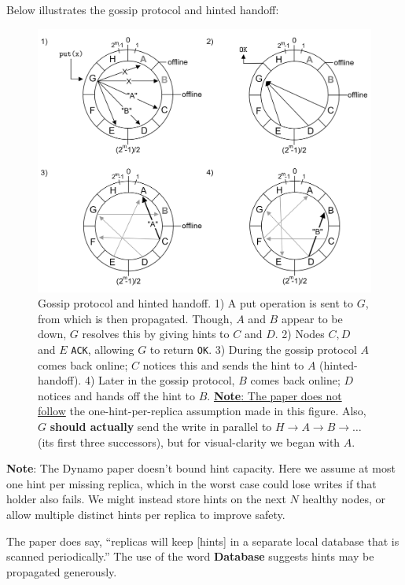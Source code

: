     \newpage 
    \noindent
    Below illustrates the gossip protocol and hinted handoff:
    \begin{figure}[h]
        
        \centering
        \includegraphics[width=\textwidth]{Sections/dyn/gossip_2.png}
        \caption{Gossip protocol and hinted handoff. 1) A put operation is sent to $G$, from which is then propagated. Though, $A$ and $B$ appear to be down, $G$ resolves this by giving hints to $C$ and $D$. 2) Nodes $C,D$ and $E$ \texttt{ACK}, allowing $G$ to return \texttt{OK}. 3) During the gossip protocol $A$ comes back online; $C$ notices this and sends the hint to $A$ (hinted-handoff). 4) Later in the 
        gossip protocol, $B$ comes back online; $D$ notices and hands off the hint to $B$. \underline{\textbf{Note}: The paper does not follow} the one-hint-per-replica assumption made in this figure. Also, $G$ \textbf{should actually} send the write in parallel to $H\to A\to B\to\dots$ (its first three successors), but for visual-clarity we began with $A$.}
        \label{fig:gossip}
    \end{figure}

    \vspace{-1em}
    \begin{Note}
        \textbf{Note}:
        The Dynamo paper doesn't bound hint capacity. Here we assume at most one hint per missing replica, which in the worst case could lose writes if that holder also fails. 
        We might instead store hints on the next $N$ healthy nodes, or allow multiple distinct hints per replica to improve safety.
        
        The paper does say, ``replicas will keep [hints] in a 
        separate local database that is scanned periodically.'' The use of the word \textbf{Database} suggests hints may be propagated generously.
    \end{Note}
    \newpage 

